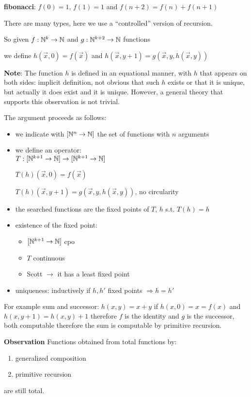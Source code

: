 \textbf{fibonacci}: $f(0) = 1$, $f(1) = 1$ and $f(n+2) = f(n) + f(n+1)$

There are many types, here we use a ``controlled'' version of recursion.

So given $f:\mathbb{N}^k\rightarrow\mathbb{N}$ and $g:\mathbb{N}^{k+2}\rightarrow\mathbb{N}$ functions

we define $ h(\vec{x},0) = f(\vec{x}) $ and $ h(\vec{x}, y+1) = g(\vec{x},y,h(\vec{x},y)) $

\textbf{Note}: The function $h$ is defined in an equational manner, with $h$ that appears on both sides: implicit definition, not obvious that such $h$ exists or that it is unique, but actually it does exist and it is unique. However, a general theory that supports this observation is not trivial.

The argument proceeds as follows:

\begin{itemize}
\item we indicate with $[\mathbb{N}^n\rightarrow\mathbb{N}]$ the set of functions with $n$ arguments
\item we define an operator:\\
  $T: [\mathbb{N}^{k+1}\rightarrow\mathbb{N}] \rightarrow [\mathbb{N}^{k+1}\rightarrow\mathbb{N}]$

  $T(h)(\vec{x},0) = f(\vec{x})$

  $T(h)(\vec{x},y+1) = g(\vec{x},y,h(\vec{x},y))$, no circularity
\item the searched functions are the fixed points of $T$, $h$ s.t. $T(h) = h$
\item existence of the fixed point:
  \begin{itemize}
  \item $[\mathbb{N}^{k+1}\rightarrow\mathbb{N}]$ cpo
  \item $T$ continuous
  \item Scott $\rightarrow$ it has a least fixed point
  \end{itemize}
\item uniqueness: inductively if $h,h'$ fixed points $\Rightarrow h=h'$
\end{itemize}

For example sum and successor: $ h(x,y) = x+y $ if $ h(x,0) = x = f(x) $ and $ h(x,y+1) = h(x,y) + 1 $ therefore $f$ is the identity and $g$ is the successor, both computable therefore the sum is computable by primitive recursion.

\textbf{Observation}
Functions obtained from total functions by:
\begin{enumerate}
\item generalized composition
\item primitive recursion
\end{enumerate}
are still total.

